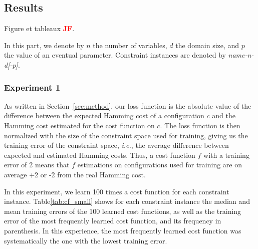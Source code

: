 \documentclass{article}
\newcommand{\ie}{\textit{i.e.}}
\newcommand{\jf}{\textcolor{red}{\bf JF}\xspace}
\begin{document}
\subsection{Results}
Figure et tableaux \jf.

In this part, we denote by $n$ the number of variables, $d$ the domain size, and $p$  the value of an eventual parameter. Constraint instances are denoted by \textit{name-n-d[-p]}.

\subsubsection{Experiment 1}


As written in  Section~\ref{sec:method}, our loss function is the absolute value of the difference between the expected Hamming cost of a  configuration $c$  and the  Hamming cost estimated for the cost function on $c$. The loss function is then normalized with the size of the constraint space used for training, giving us the training error of the constraint space, \ie,  the average difference between expected and estimated  Hamming costs.   Thus,  a  cost function $f$  with a training error of 2  means that  $f$ estimations on configurations used for training are on average +2 or -2 from the real Hamming cost.


In  this experiment,  we  learn 100  times a  cost  function for  each
constraint instance. Table\ref{tab:cf_small} shows for each constraint
instance the median  and mean training errors of the  100 learned cost
functions,  as well  as  the  training error  of  the most  frequently
learned  cost function,  and  its frequency  in  parenthesis. In  this
experience,   the   most   frequently  learned   cost   function   was
systematically the one with the lowest training error.
\end{document}

